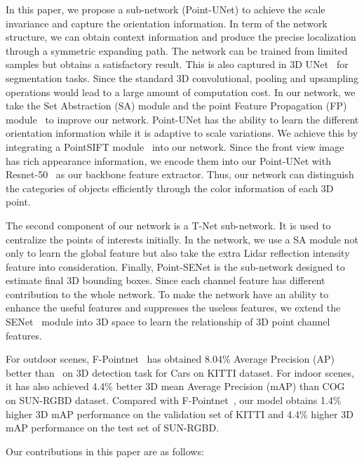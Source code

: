 \documentclass[letterpaper]{article} %
\begin{document}
In this paper, we propose a sub-network (Point-UNet) to achieve the scale invariance and capture the orientation information. In term of the network structure, we can obtain context information and produce the precise localization through a symmetric expanding path. The network can be trained from limited samples but obtains a satisfactory result. This is also captured in 3D UNet~\cite{cciccek20163d} for segmentation tasks. Since the standard 3D convolutional, pooling and upsampling operations would lead to a large amount of computation cost. In our network, we take the Set Abstraction (SA) module and the point Feature Propagation (FP) module~\cite{qi2017pointnet++} to improve our network. Point-UNet has the ability to learn the different orientation information while it is adaptive to scale variations. We achieve this by integrating a PointSIFT module~\cite{jiang2018pointsift} into our network. Since the front view image has rich appearance information, we encode them into our Point-UNet with Resnet-50~\cite{he2016deep} as our backbone feature extractor. Thus, our network can distinguish the categories of objects efficiently through the color information of each 3D point.

The second component of our network is a T-Net sub-network. It is used to centralize the points of interests initially. In the network, we use a SA module not only to learn the global feature but also take the extra Lidar reflection intensity feature into consideration. Finally, Point-SENet is the sub-network designed to estimate final 3D bounding boxes. Since each channel feature has different contribution to the whole network. To make the network have an ability to enhance the useful features and suppresses the useless features, we extend the SENet~\cite{hu2017squeeze} module into 3D space to learn the relationship of 3D point channel features.

For outdoor scenes, F-Pointnet~\cite{qi2017frustum} has obtained 8.04\% Average Precision (AP) better than~\cite{chen2017multi} on 3D detection task for Cars on KITTI dataset. For indoor scenes, it has also achieved 4.4\% better 3D mean Average Precision (mAP) than COG~\cite{ren2016three} on SUN-RGBD dataset. Compared with F-Pointnet~\cite{qi2017frustum}, our model obtains 1.4\% higher 3D mAP performance on the validation set of KITTI and 4.4\% higher 3D mAP performance on the test set of SUN-RGBD.

Our contributions in this paper are as follows:
\end{document}
